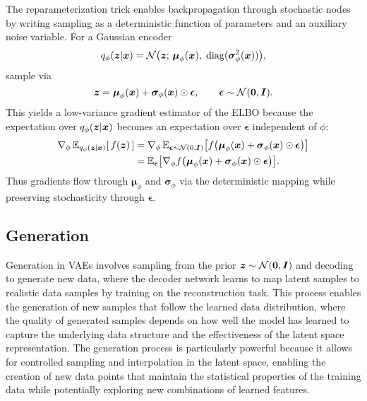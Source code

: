 The reparameterization trick enables backpropagation through stochastic nodes by writing sampling as a deterministic function of parameters and an auxiliary noise variable. For a Gaussian encoder
\begin{equation}
q_{\phi}(\boldsymbol{z}|\boldsymbol{x}) = \mathcal{N}\big(\boldsymbol{z};\, \boldsymbol{\mu}_{\phi}(\boldsymbol{x}),\; \mathrm{diag}(\boldsymbol{\sigma}^2_{\phi}(\boldsymbol{x}))\big),
\end{equation}
sample via
\begin{equation}
\boldsymbol{z} = \boldsymbol{\mu}_{\phi}(\boldsymbol{x}) + \boldsymbol{\sigma}_{\phi}(\boldsymbol{x}) \odot \boldsymbol{\epsilon},\qquad \boldsymbol{\epsilon} \sim \mathcal{N}(\boldsymbol{0}, \boldsymbol{I}).
\end{equation}
This yields a low-variance gradient estimator of the ELBO because the expectation over $q_{\phi}(\boldsymbol{z}|\boldsymbol{x})$ becomes an expectation over $\boldsymbol{\epsilon}$ independent of $\phi$:
\begin{align}
\nabla_{\phi} \, \mathbb{E}_{q_{\phi}(\boldsymbol{z}|\boldsymbol{x})}[\,f(\boldsymbol{z})\,] &= \nabla_{\phi} \, \mathbb{E}_{\boldsymbol{\epsilon} \sim \mathcal{N}(0,\boldsymbol{I})}\big[ f\big(\boldsymbol{\mu}_{\phi}(\boldsymbol{x}) + \boldsymbol{\sigma}_{\phi}(\boldsymbol{x}) \odot \boldsymbol{\epsilon}\big) \big] \\
&= \mathbb{E}_{\boldsymbol{\epsilon}}\big[ \nabla_{\phi} f\big(\boldsymbol{\mu}_{\phi}(\boldsymbol{x}) + \boldsymbol{\sigma}_{\phi}(\boldsymbol{x}) \odot \boldsymbol{\epsilon}\big) \big].
\end{align}
Thus gradients flow through $\boldsymbol{\mu}_{\phi}$ and $\boldsymbol{\sigma}_{\phi}$ via the deterministic mapping while preserving stochasticity through $\boldsymbol{\epsilon}$.

\subsection{Generation}

Generation in VAEs involves sampling from the prior $\boldsymbol{z} \sim \mathcal{N}(\boldsymbol{0}, \boldsymbol{I})$ and decoding to generate new data, where the decoder network learns to map latent samples to realistic data samples by training on the reconstruction task. This process enables the generation of new samples that follow the learned data distribution, where the quality of generated samples depends on how well the model has learned to capture the underlying data structure and the effectiveness of the latent space representation. The generation process is particularly powerful because it allows for controlled sampling and interpolation in the latent space, enabling the creation of new data points that maintain the statistical properties of the training data while potentially exploring new combinations of learned features.

